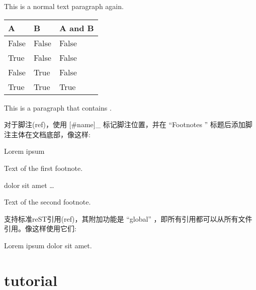\documentclass[letterpaper,10pt,english]{sphinxmanual}
\begin{document}
\begin{sphinxVerbatim}[commandchars=\\\{\}]
       
    

    
\end{sphinxVerbatim}

This is a normal text paragraph again.


\begin{savenotes}\sphinxattablestart
\centering
\begin{tabulary}{\linewidth}[t]{|T|T|T|}
\hline
\sphinxstyletheadfamily 
A
&\sphinxstyletheadfamily 
B
&\sphinxstyletheadfamily 
A and B
\\
\hline
False
&
False
&
False
\\
\hline
True
&
False
&
False
\\
\hline
False
&
True
&
False
\\
\hline
True
&
True
&
True
\\
\hline
\end{tabulary}
\par
\sphinxattableend\end{savenotes}

This is a paragraph that contains .

\noindent{}

对于脚注(ref)，使用 {[}\#name{]}\_ 标记脚注位置，并在 “Footnotes ” 标题后添加脚注主体在文档底部，像这样:

Lorem ipsum %
\begin{footnote}[1]\sphinxAtStartFootnote
Text of the first footnote.
%
\end{footnote} dolor sit amet … %
\begin{footnote}[2]\sphinxAtStartFootnote
Text of the second footnote.
%
\end{footnote}

支持标准reST引用(ref)，其附加功能是 “global” ，即所有引用都可以从所有文件引用。像这样使用它们:

Lorem ipsum  dolor sit amet.


\chapter{tutorial}
\label{\detokenize{tutorial:tutorial}}\label{\detokenize{tutorial::doc}}
\end{document}
